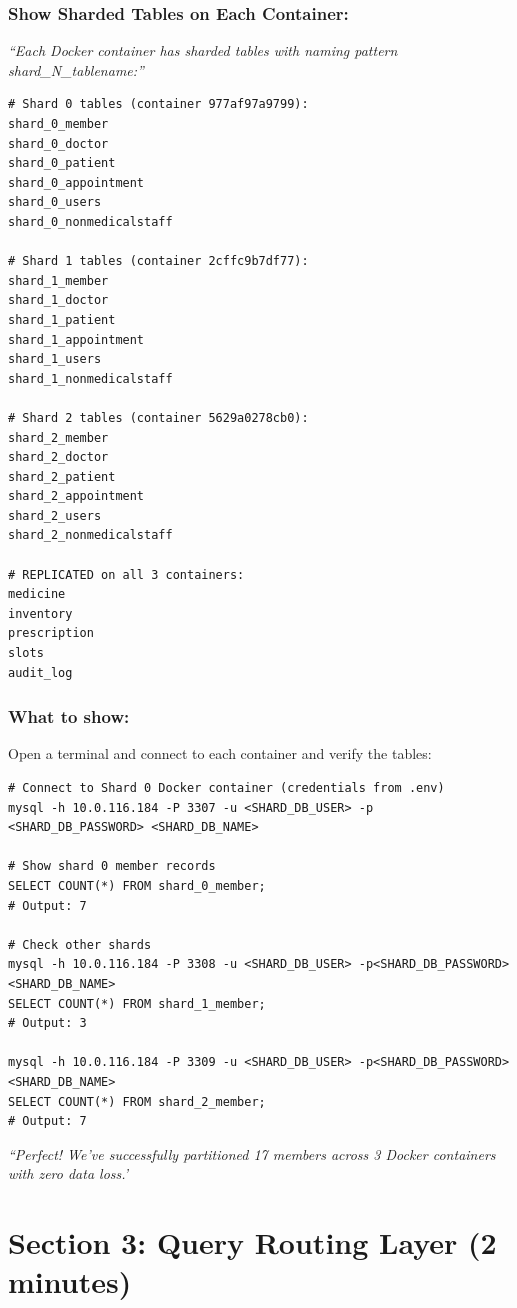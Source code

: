 \documentclass[12pt]{article}
\begin{document}
\subsubsection*{Show Sharded Tables on Each Container:}

\textit{``Each Docker container has sharded tables with naming pattern shard\_N\_tablename:''}

\begin{lstlisting}
# Shard 0 tables (container 977af97a9799):
shard_0_member
shard_0_doctor
shard_0_patient
shard_0_appointment
shard_0_users
shard_0_nonmedicalstaff

# Shard 1 tables (container 2cffc9b7df77):
shard_1_member
shard_1_doctor
shard_1_patient
shard_1_appointment
shard_1_users
shard_1_nonmedicalstaff

# Shard 2 tables (container 5629a0278cb0):
shard_2_member
shard_2_doctor
shard_2_patient
shard_2_appointment
shard_2_users
shard_2_nonmedicalstaff

# REPLICATED on all 3 containers:
medicine
inventory
prescription
slots
audit_log
\end{lstlisting}

\subsubsection*{What to show:}

Open a terminal and connect to each container and verify the tables:

\begin{lstlisting}
# Connect to Shard 0 Docker container (credentials from .env)
mysql -h 10.0.116.184 -P 3307 -u <SHARD_DB_USER> -p <SHARD_DB_PASSWORD> <SHARD_DB_NAME>

# Show shard 0 member records
SELECT COUNT(*) FROM shard_0_member;
# Output: 7

# Check other shards
mysql -h 10.0.116.184 -P 3308 -u <SHARD_DB_USER> -p<SHARD_DB_PASSWORD> <SHARD_DB_NAME>
SELECT COUNT(*) FROM shard_1_member;
# Output: 3

mysql -h 10.0.116.184 -P 3309 -u <SHARD_DB_USER> -p<SHARD_DB_PASSWORD> <SHARD_DB_NAME>
SELECT COUNT(*) FROM shard_2_member;
# Output: 7
\end{lstlisting}

\textit{``Perfect! We've successfully partitioned 17 members across 3 Docker containers with zero data loss.'}

\section{Section 3: Query Routing Layer (2 minutes)}
\end{document}
